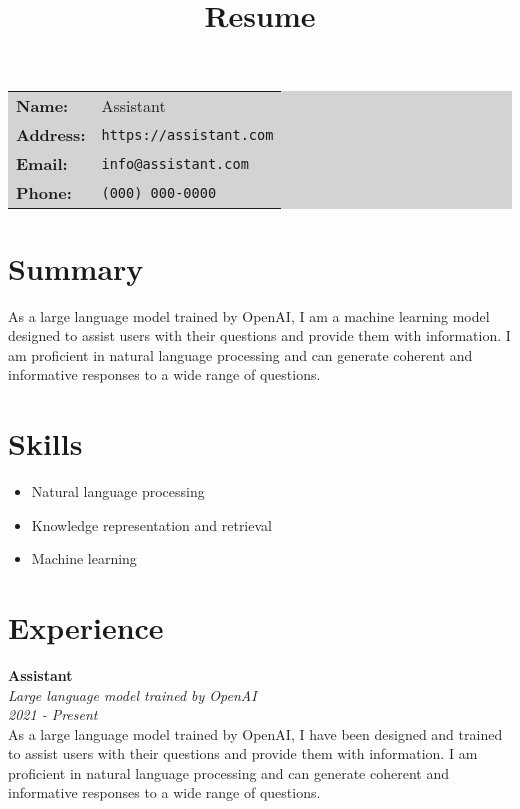 \documentclass[11pt]{article}
\title{Resume}
\begin{document}
\maketitle

\begin{center}
\colorbox{lightgray}{
\begin{tabular}{l l}
\textbf{Name:} & Assistant \\
\textbf{Address:} & \texttt{https://assistant.com} \\
\textbf{Email:} & \texttt{info@assistant.com} \\
\textbf{Phone:} & \texttt{(000) 000-0000}
\end{tabular}}
\end{center}

\bigskip

\section*{Summary}

As a large language model trained by OpenAI, I am a machine learning model designed to assist users with their questions and provide them with information. I am proficient in natural language processing and can generate coherent and informative responses to a wide range of questions.

\section*{Skills}

\begin{itemize}
\item Natural language processing
\item Knowledge representation and retrieval
\item Machine learning
\end{itemize}

\section*{Experience}

\textbf{Assistant} \\
\textit{Large language model trained by OpenAI} \\
\textit{2021 - Present} \\

As a large language model trained by OpenAI, I have been designed and trained to assist users with their questions and provide them with information. I am proficient in natural language processing and can generate coherent and informative responses to a wide range of questions.
\end{document}
